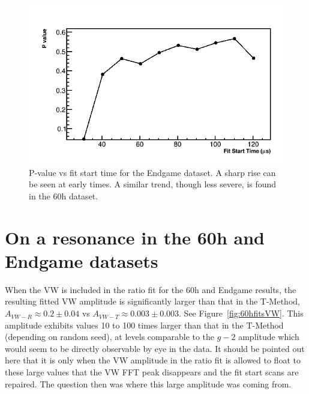 \documentclass[12pt,letterpaper]{article}
\newcommand{\figref}[1]{Figure~\ref{#1}}
\def\gmtwo{$g-2$\xspace}
\begin{document}
\begin{figure}[]
    \centering
    \includegraphics[width=.5\textwidth]{Pvalue_Endgame_noRand}
    \caption[]{P-value vs fit start time for the Endgame dataset. A sharp rise can be seen at early times. A similar trend, though less severe, is found in the 60h dataset.}
    \label{fig:Pvalue_Endgame}
\end{figure}

\clearpage

\section{On a resonance in the 60h and Endgame datasets}

When the VW is included in the ratio fit for the 60h and Endgame results, the resulting fitted VW amplitude is significantly larger than that in the T-Method, $A_{VW-R} \approx 0.2 \pm 0.04$ vs $A_{VW-T} \approx 0.003 \pm 0.003$. See \figref{fig:60hfitsVW}. This amplitude exhibits values 10 to 100 times larger than that in the T-Method (depending on random seed), at levels comparable to the \gmtwo amplitude which would seem to be directly observable by eye in the data. It should be pointed out here that it is only when the VW amplitude in the ratio fit is allowed to float to these large values that the VW FFT peak disappears and the fit start scans are repaired. The question then was where this large amplitude was coming from.
\end{document}
